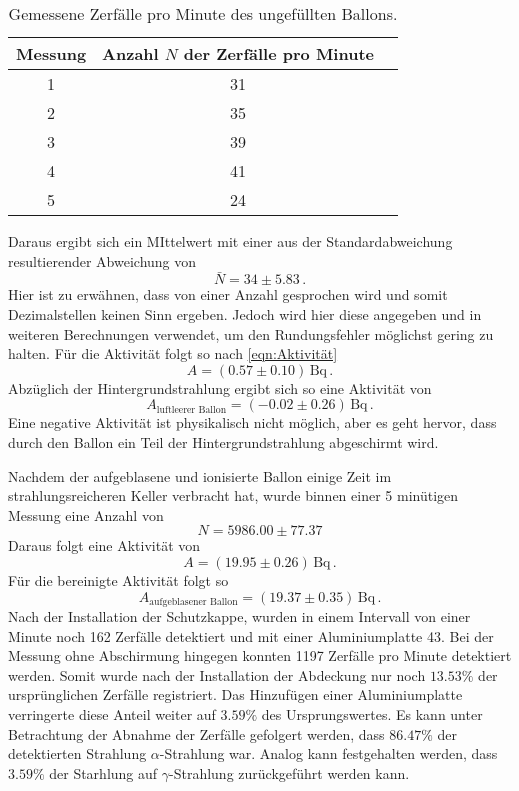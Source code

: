 \begin{table}
    \centering 
    \caption{Gemessene Zerfälle pro Minute des ungefüllten Ballons.}
    \begin{tabular}{c c c}
        \toprule
        Messung & Anzahl $N$ der Zerfälle pro Minute\\
        \midrule
        1 & 31 \\
        2 & 35 \\
        3 & 39 \\
        4 & 41 \\
        5 & 24 \\
    \end{tabular}
    \label{tab:loon}
\end{table}
Daraus ergibt sich ein MIttelwert mit einer aus der Standardabweichung resultierender Abweichung von
\begin{equation*}
    \bar{N}= 34\pm 5.83\, .
\end{equation*}
Hier ist zu erwähnen, dass von einer Anzahl gesprochen wird und somit Dezimalstellen keinen Sinn ergeben. Jedoch wird hier diese angegeben und in weiteren 
Berechnungen verwendet, um den Rundungsfehler möglichst gering zu halten.
Für die Aktivität folgt so nach \autoref{eqn:Aktivität}
\begin{equation*}
    A= (0.57\pm 0.10)\, \text{Bq}\, .
\end{equation*}
Abzüglich der Hintergrundstrahlung ergibt sich so eine Aktivität von
\begin{equation*}
    A_{\text{luftleerer Ballon}}= (-0.02\pm 0.26)\, \text{Bq}\, .
\end{equation*}
Eine negative Aktivität ist physikalisch nicht möglich, aber es geht hervor, dass durch den Ballon ein Teil der Hintergrundstrahlung abgeschirmt wird.

Nachdem der aufgeblasene und ionisierte Ballon einige Zeit im strahlungsreicheren Keller verbracht hat, wurde binnen einer 5 minütigen Messung eine Anzahl
von 
\begin{equation*}
    N= 5986.00 \pm 77.37
\end{equation*} 
Daraus folgt eine Aktivität von
\begin{equation*}
    A= (19.95 \pm 0.26) \, \text{Bq}\, .
\end{equation*}
Für die bereinigte Aktivität folgt so 
\begin{equation*}
    A_{\text{aufgeblasener Ballon}}= (19.37\pm 0.35) \, \text{Bq}\, .
\end{equation*}
Nach der Installation der Schutzkappe, wurden in einem Intervall von einer Minute noch 162 Zerfälle detektiert und mit einer Aluminiumplatte 43.
Bei der Messung ohne Abschirmung hingegen konnten 1197 Zerfälle pro Minute detektiert werden.
Somit wurde nach der Installation der Abdeckung nur noch $13.53\%$ der ursprünglichen Zerfälle registriert.
Das Hinzufügen einer Aluminiumplatte verringerte diese Anteil weiter  auf $3.59\%$ des Ursprungswertes.
Es kann unter Betrachtung der Abnahme der Zerfälle gefolgert werden, dass $86.47\%$ der detektierten Strahlung $\alpha$-Strahlung war.
Analog kann festgehalten werden, dass $3.59\%$ der Starhlung auf $\gamma$-Strahlung zurückgeführt werden kann.